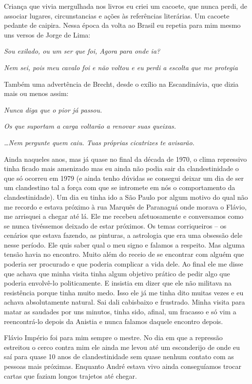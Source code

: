 Criança que vivia mergulhada nos livros eu criei um cacoete, que nunca
perdi, de associar lugares, circunstancias e ações às referências
literárias. Um cacoete pedante de caipira. Nessa época da volta ao
Brasil eu repetia para mim mesmo uns versos de Jorge de Lima:

\startblockquote
{\it Sou exilado, ou um ser que foi, Agora para onde ia?}

{\it Nem sei, pois meu cavalo foi e não voltou e eu perdi a escolta que
me protegia}

Também uma advertência de Brecht, desde o exílio na Escandinávia, que
dizia mais ou menos assim:

{\it Nunca diga que o pior já passou.}

{\it Os que suportam a carga voltarão a renovar suas queixas.}

{\it \ldots{}Nem pergunte quem caiu. Tuas próprias cicatrizes te
avisarão.}
\stopblockquote

Ainda naqueles anos, mas já quase no final da década de 1970, o clima
repressivo tinha ficado mais amenizado mas eu ainda não podia sair da
clandestinidade o que só ocorreu em 1979 (e ainda tenho dúvidas se
consegui deixar um dia de ser um clandestino tal a força com que se
intromete em nós o comportamento da clandestinidade). Um dia eu tinha
ido a São Paulo por algum motivo do qual não me recordo e estava próximo
à rua Marquês de Paranaguá onde morava o Flávio, me arrisquei a chegar
até lá. Ele me recebeu afetuosamente e conversamos como se nunca
tivéssemos deixado de estar próximos. Os temas corriqueiros -- os
cenários que estava fazendo, as pinturas, a astrologia que era uma
obsessão dele nesse período. Ele quis saber qual o meu signo e falamos a
respeito. Mas alguma tensão havia no encontro. Muito além do receio de
se encontrar com alguém que poderia ser procurado e que poderia
complicar a vida dele. Ao final ele me disse que achava que minha visita
tinha algum objetivo prático de pedir algo que poderia envolvê-lo
politicamente. E insistia em dizer que ele não militava na resistência
porque tinha muito medo. Isso ele já me tinha dito muitas vezes e eu
achava absolutamente natural. Sai dali cabisbaixo e frustrado. Minha
visita para matar as saudades por uns minutos, tinha sido, afinal, um
fracasso e só vim a reencontrá-lo depois da Anistia e nunca falamos
daquele encontro depois.

Flávio Império foi para mim sempre o mestre. No dia em que a repressão
estreitou o cerco contra mim ele ainda me levou até um esconderijo de
onde eu saí para quase 10 anos de clandestinidade sem quase nenhum
contato com as pessoas mais próximas. Enquanto André estava vivo ainda
conseguíamos trocar cartas que faziam longos trajetos até chegar.

